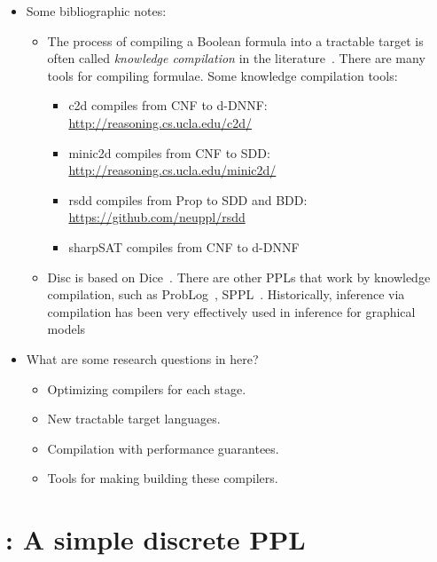 \documentclass{tufte-handout}
\begin{document}
\begin{itemize}
  \item Some bibliographic notes: 
  \begin{itemize}
    \item The process of compiling a Boolean formula into a tractable target is
      often called \emph{knowledge compilation} in the
      literature~\citep{darwiche2002knowledge}. There are many tools for compiling 
      formulae. Some knowledge compilation tools:
      \begin{itemize}
        \item c2d compiles from CNF to d-DNNF: \url{http://reasoning.cs.ucla.edu/c2d/}
        \item minic2d compiles from CNF to SDD: \url{http://reasoning.cs.ucla.edu/minic2d/}
        \item rsdd compiles from Prop to SDD and BDD: \url{https://github.com/neuppl/rsdd}
        \item sharpSAT compiles from CNF to d-DNNF \citep{muise2012d}
      \end{itemize}
    \item Disc is based on Dice~\citep{holtzen2020scaling}. There are other PPLs
    that work by knowledge compilation, such as
    ProbLog~\citep{fierens2015inference,de2007problog},
    SPPL~\citep{saad2021sppl}. Historically, inference via compilation has been 
    very effectively used in inference for graphical models~\citep{chavira2008probabilistic,sang2005performing}
  \end{itemize}

  \item What are some research questions in here?
  \begin{itemize}
    \item Optimizing compilers for each stage.
    \item New tractable target languages.
    \item Compilation with performance guarantees.
    \item Tools for making building these compilers.
  \end{itemize}
\end{itemize}

\section{\disc{}: A simple discrete PPL}
\end{document}
